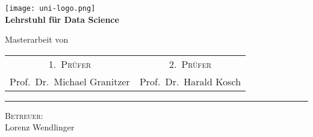 \begin{titlepage}
    \centering
    \begin{onehalfspace}
    	
        	\texttt{[image: uni-logo.png]}\\
        	\vspace{1.0cm}
        	\large {\bfseries Lehrstuhl f\"ur Data Science }\\

        	\vspace{2.5cm}

            \begin{doublespace}
            	{\textsf{\Huge{\thetitle}}}
            \end{doublespace}

        	\vspace{2cm}

            \Large{Masterarbeit von}\\

        	\vspace{1cm}

        	{\bfseries \large{\theauthor}}

        	\vfill

        	{\large
        		\begin{tabular}[l]{cc}
        			\textsc{1.~Pr\"ufer} & \textsc{2.~Pr\"ufer} \\
        			Prof.~Dr.~Michael Granitzer& Prof.~Dr.~Harald Kosch\\

                
        		\end{tabular}
        	}

        	\vspace{1.5cm}
                
        	\parbox{\linewidth}{\hrule\strut}
            \small{\textsc{Betreuer: }\\
                Lorenz Wendlinger}
            
            \vfill

	    \thedate
    \end{onehalfspace}
\end{titlepage}
